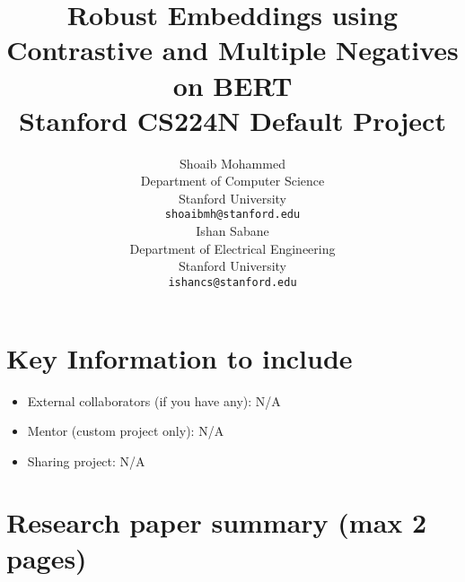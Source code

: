 \documentclass{article}
\title{
   Robust Embeddings using Contrastive and Multiple Negatives on BERT \\
  \vspace{1em}
  \small{\normalfont Stanford CS224N Default Project}  %
}
\author{
  Shoaib Mohammed \\
  Department of Computer Science \\
  Stanford University \\
  \texttt{shoaibmh@stanford.edu} \\
  \And
  Ishan Sabane \\
  Department of Electrical Engineering \\
  Stanford University \\
  \texttt{ishancs@stanford.edu} \\
}
\begin{document}
\maketitle


\section{Key Information to include}

\begin{itemize}
    \item External collaborators (if you have any): N/A
    \item Mentor (custom project only): N/A
    \item Sharing project: N/A
\end{itemize}


\section{Research paper summary (max 2 pages)}



\end{document}
